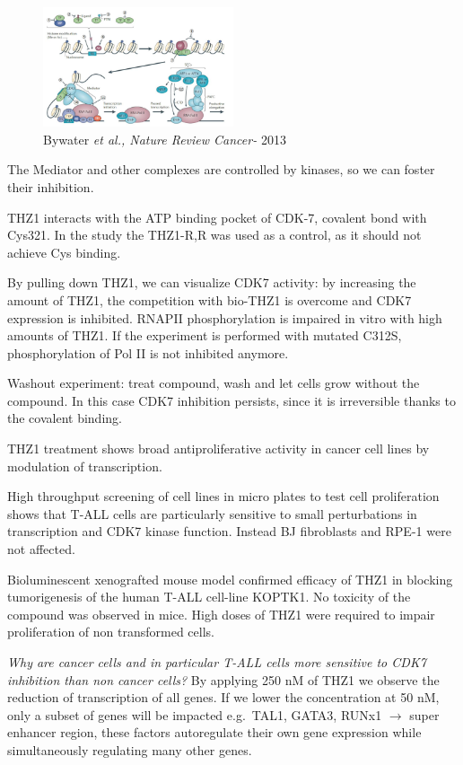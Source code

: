 \begin{figure}
\centering
\includegraphics[width=0.5\textwidth]{../_resources/Screen_Shot_2022-11-04_at_11-55-34.png}
\caption{Bywater \emph{et al., Nature Review Cancer-} 2013}
\label{fig:protac}
\end{figure}

The Mediator and other complexes are controlled by kinases, so we can foster their inhibition.

THZ1 interacts with the ATP binding pocket of CDK-7, covalent bond with Cys321. In the study the THZ1-R,R was used as a control, as it should not achieve Cys binding.

By pulling down THZ1, we can visualize CDK7 activity: by increasing the amount of THZ1, the competition with bio-THZ1 is overcome and CDK7 expression is inhibited. RNAPII phosphorylation is impaired in vitro with high amounts of THZ1. If the experiment is performed with mutated C312S, phosphorylation of Pol II is not inhibited anymore.

Washout experiment: treat compound, wash and let cells grow without the compound. In this case CDK7 inhibition persists, since it is irreversible thanks to the covalent binding.

THZ1 treatment shows broad antiproliferative activity in cancer cell lines by modulation of transcription.

High throughput screening of cell lines in micro plates to test cell proliferation shows that T-ALL cells are particularly sensitive to small perturbations in transcription and CDK7 kinase function. Instead BJ fibroblasts and RPE-1 were not affected.

Bioluminescent xenografted mouse model confirmed efficacy of THZ1 in blocking tumorigenesis of the human T-ALL cell-line KOPTK1. No toxicity of the compound was observed in mice. High doses of THZ1 were required to impair proliferation of non transformed cells.

\emph{Why are cancer cells and in particular T-ALL cells more sensitive to CDK7 inhibition than non cancer cells?} By applying 250 nM of THZ1 we observe the reduction of transcription of all genes. If we lower the concentration at 50 nM, only a subset of genes will be impacted e.g.~TAL1, GATA3, RUNx1 $\rightarrow$ super enhancer region, these factors autoregulate their own gene expression while simultaneously regulating many other genes.


